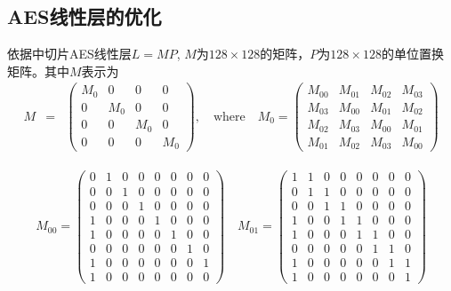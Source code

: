 \documentclass[11pt,a4paper]{article}
\begin{document}
\subsection{AES线性层的优化}

依据\cite{Adomnicai2021}中切片AES线性层$L=MP$, $M$为$128 \times 128$的矩阵，$P$为$128 \times 128$的单位置换矩阵。其中$M$表示为 
\begin{eqnarray*}
  M &=& \left(
  \begin{array}{cccc}
    M_0 & 0 & 0 & 0 \\
    0 & M_0 & 0 & 0 \\
    0 & 0 & M_0 & 0 \\
    0 & 0 & 0 & M_0
  \end{array}
  \right), \quad \text{where} \quad
  M_0 = \left(
  \begin{array}{cccc}
    M_{00} & M_{01} & M_{02} & M_{03} \\
    M_{03} & M_{00} & M_{01} & M_{02} \\
    M_{02} & M_{03} & M_{00} & M_{01} \\
    M_{01} & M_{02} & M_{03} & M_{00}
  \end{array}
  \right)
  \end{eqnarray*}

\begin{eqnarray*}
  M_{00} = \left(\begin{array}{rrrrrrrr}
    0 & 1 & 0 & 0 & 0 & 0 & 0 & 0 \\
    0 & 0 & 1 & 0 & 0 & 0 & 0 & 0 \\
    0 & 0 & 0 & 1 & 0 & 0 & 0 & 0 \\
    1 & 0 & 0 & 0 & 1 & 0 & 0 & 0 \\
    1 & 0 & 0 & 0 & 0 & 1 & 0 & 0 \\
    0 & 0 & 0 & 0 & 0 & 0 & 1 & 0 \\
    1 & 0 & 0 & 0 & 0 & 0 & 0 & 1 \\
    1 & 0 & 0 & 0 & 0 & 0 & 0 & 0
    \end{array}\right)\quad
  M_{01} = \left(\begin{array}{rrrrrrrr}
    1 & 1 & 0 & 0 & 0 & 0 & 0 & 0 \\
    0 & 1 & 1 & 0 & 0 & 0 & 0 & 0 \\
    0 & 0 & 1 & 1 & 0 & 0 & 0 & 0 \\
    1 & 0 & 0 & 1 & 1 & 0 & 0 & 0 \\
    1 & 0 & 0 & 0 & 1 & 1 & 0 & 0 \\
    0 & 0 & 0 & 0 & 0 & 1 & 1 & 0 \\
    1 & 0 & 0 & 0 & 0 & 0 & 1 & 1 \\
    1 & 0 & 0 & 0 & 0 & 0 & 0 & 1
    \end{array}\right)
\end{eqnarray*}
\end{document}
